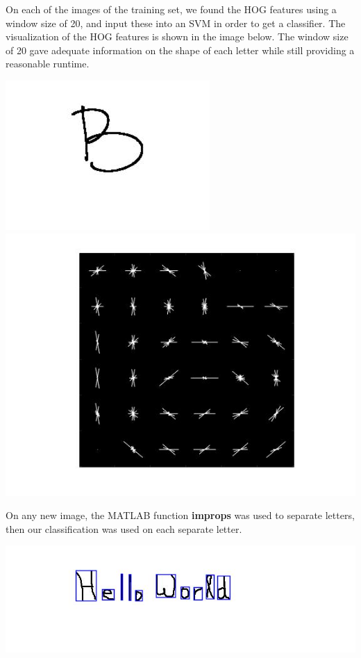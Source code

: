 \documentclass{article} %
\begin{document}
On each of the images of the training set, we found the HOG features using a window size of 20, and input these into an SVM in order to get a classifier. The visualization of the HOG features is shown in the image below. The window size of 20 gave adequate information on the shape of each letter while still providing a reasonable runtime. 
\begin{center}
\includegraphics[scale = 0.25]{B1.jpg}
\includegraphics[scale = 0.25]{B1hog.jpg}
\end{center}
On any new image, the MATLAB function \textbf{improps} was used to separate letters, then our classification was used on each separate letter.
\begin{center}
\includegraphics[scale = 0.5]{boxexample2.jpg}
\end{center}
\end{document}
